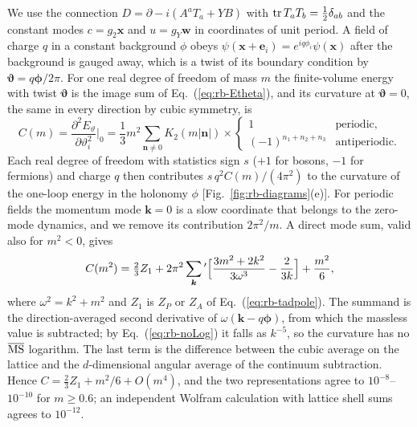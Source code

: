 We use the connection $D=\partial-i(A^aT_a+YB)$ with ${\rm tr}\,T_aT_b=\frac12\delta_{ab}$ and the constant modes $c=g_2\bm x$ and $u=g_Y\bm w$ in coordinates of unit period.
A field of charge $q$ in a constant background $\phi$ obeys $\psi(\bm x+\bm e_i)=e^{iq\phi_i}\psi(\bm x)$ after the background is gauged away, which is a twist of its boundary condition by $\bm\vartheta=q\bm\phi/2\pi$.
For one real degree of freedom of mass $m$ the finite-volume energy with twist $\bm\vartheta$ is the image sum of Eq.~(\ref{eq:rb-Etheta}), and its curvature at $\bm\vartheta=0$, the same in every direction by cubic symmetry, is
\begin{equation}
C(m)=\frac{\partial^2E_\vartheta}{\partial\vartheta_i^2}\Big|_0=\frac13m^2\sum_{\bm n\neq0}K_2(m|\bm n|)\times\begin{cases}1&\text{periodic},\\(-1)^{n_1+n_2+n_3}&\text{antiperiodic}.\end{cases}
\label{eq:rb-curv}
\end{equation}
Each real degree of freedom with statistics sign $s$ ($+1$ for bosons, $-1$ for fermions) and charge $q$ then contributes $s\,q^2C(m)/(4\pi^2)$ to the curvature of the one-loop energy in the holonomy $\phi$ [Fig.~\ref{fig:rb-diagrams}(e)].
For periodic fields the momentum mode $\bm k=0$ is a slow coordinate that belongs to the zero-mode dynamics, and we remove its contribution $2\pi^2/m$.
A direct mode sum, valid also for $m^2<0$, gives
\begin{equation}
C(m^2)=\tfrac23Z_1+2\pi^2\sum_{\bm k}{}'\Bigl[\frac{3m^2+2k^2}{3\omega^3}-\frac{2}{3k}\Bigr]+\frac{m^2}{6},
\label{eq:rb-curv-direct}
\end{equation}
where $\omega^2=k^2+m^2$ and $Z_1$ is $Z_P$ or $Z_A$ of Eq.~(\ref{eq:rb-tadpole}).
The summand is the direction-averaged second derivative of $\omega(\bm k-q\bm\phi)$, from which the massless value is subtracted; by Eq.~(\ref{eq:rb-noLog}) it falls as $k^{-5}$, so the curvature has no $\overline{\mathrm{MS}}$ logarithm.
The last term is the difference between the cubic average on the lattice and the $d$-dimensional angular average of the continuum subtraction.
Hence $C=\frac23Z_1+m^2/6+O(m^4)$, and the two representations agree to $10^{-8}$--$10^{-10}$ for $m\ge0.6$; an independent Wolfram calculation with lattice shell sums agrees to $10^{-12}$. %

